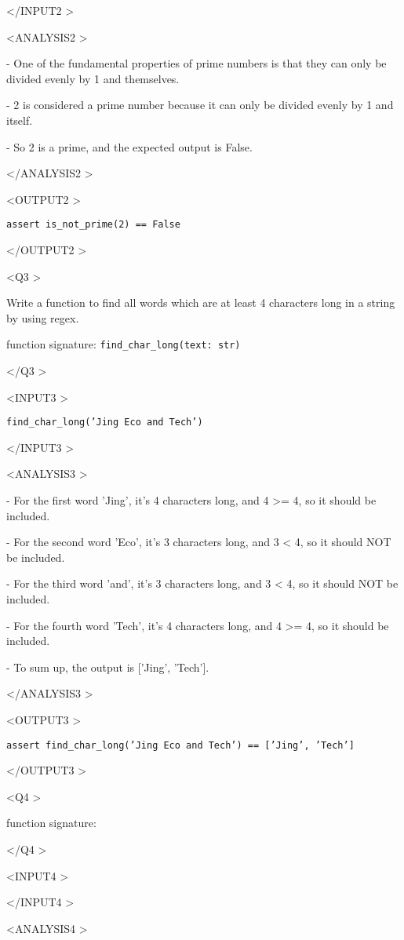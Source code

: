 \begin{tcolorbox}
\textless /INPUT2 \textgreater

\textless ANALYSIS2 \textgreater

- One of the fundamental properties of prime numbers is that they can only be divided evenly by 1 and themselves.

- 2 is considered a prime number because it can only be divided evenly by 1 and itself.

- So 2 is a prime, and the expected output is False.

\textless /ANALYSIS2 \textgreater

\textless OUTPUT2 \textgreater

{\tt assert is\_not\_prime(2) == False}

\textless /OUTPUT2 \textgreater

\textless Q3 \textgreater

Write a function to find all words which are at least 4 characters long in a string by using regex.

function signature: {\tt find\_char\_long(text: str)}

\textless /Q3 \textgreater

\textless INPUT3 \textgreater

{\tt find\_char\_long('Jing Eco and Tech')}

\textless /INPUT3 \textgreater

\textless ANALYSIS3 \textgreater

- For the first word 'Jing', it's 4 characters long, and 4 >= 4, so it should be included.

- For the second word 'Eco', it's 3 characters long, and 3 < 4, so it should NOT be 
included.

- For the third word 'and', it's 3 characters long, and 3 < 4, so it should NOT be included.

- For the fourth word 'Tech', it's 4 characters long, and 4 >= 4, so it should be included.

- To sum up, the output is ['Jing', 'Tech'].

\textless /ANALYSIS3 \textgreater

\textless OUTPUT3 \textgreater

{\tt assert find\_char\_long('Jing Eco and Tech') == ['Jing', 'Tech']}

\textless /OUTPUT3 \textgreater

\textless Q4 \textgreater

{}

function signature: {}

\textless /Q4 \textgreater

\textless INPUT4 \textgreater

{}

\textless /INPUT4 \textgreater

\textless ANALYSIS4 \textgreater
\end{tcolorbox}

